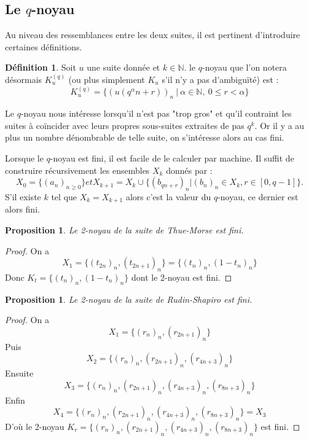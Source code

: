 \documentclass[12pt]{article}
\theoremstyle{plain}
\newtheorem{proposition}[theoreme]{Proposition}
\theoremstyle{definition}
\newtheorem{definition}[theoreme]{D\'efinition}
\theoremstyle{remark}
\begin{document}
\subsection{Le $q$-noyau}

Au niveau des ressemblances entre les deux suites, il est pertinent d'introduire certaines d\'efinitions.

\begin{definition}
  Soit $u$ une suite donn\'ee et $k\in\mathbb{N}$. le $q$-noyau que l'on notera d\'esormais 
  $K_{u}^{(q)}$ (ou plus simplement $K_{u}$ s'il n'y a pas d'ambigu\"it\'e) est :
  \begin{displaymath}
    K_{u}^{(q)}=\{(u(q^{\alpha}n+r))_{n}\ |\ \alpha\in\mathbb{N},\ 0\le{r}<\alpha\}
  \end{displaymath}
\end{definition}

Le $q$-noyau nous int\'eresse lorsqu'il n'est pas "trop gros" et qu'il contraint les suites \`a co\"incider avec leurs propres sous-suites extraites de pas $q^{k}$. Or il y a au plus un nombre d\'enombrable de telle suite, on s'int\'eresse alors au cas fini.

Lorsque le $q$-noyau est fini, il est facile de le calculer par machine. Il suffit de construire r\'ecursivement les ensembles $X_{k}$ donn\'es par : 
$$X_{0}=\{(a_{n})_{n\ge 0}\} et X_{k+1}=X_{k}\cup\{(b_{qn+r})_{n}|(b_{n})_{n}\in{X_{k}},r\in{[0,q-1]}\}.$$
S'il existe $k$ tel que $X_{k}=X_{k+1}$ alors c'est la valeur du $q$-noyau, ce dernier est alors fini.

\begin{proposition}
  Le 2-noyau de la suite de Thue-Morse est fini.
\end{proposition}

\begin{proof}
  On a $$X_{1}=\{(t_{2n})_{n},(t_{2n+1})_{n}\}=\{(t_{n})_{n},(1-t_{n})_{n}\}$$
  Donc $K_{t}=\{(t_{n})_{n},(1-t_{n})_{n}\}$ dont le 2-noyau est fini.
\end{proof}

\begin{proposition}
  Le 2-noyau de la suite de Rudin-Shapiro est fini.
\end{proposition}

\begin{proof}
  On a $$X_{1}=\{(r_{n})_{n},(r_{2n+1})_{n}\}$$
  Puis $$X_{2}=\{(r_{n})_{n},(r_{2n+1})_{n},(r_{4n+3})_{n}\}$$
  Ensuite $$X_{3}=\{(r_{n})_{n},(r_{2n+1})_{n},(r_{4n+3})_{n},(r_{8n+3})_{n}\}$$
  Enfin $$X_{4}=\{(r_{n})_{n},(r_{2n+1})_{n},(r_{4n+3})_{n},(r_{8n+3})_{n}\}=X_{3}$$
  D'o\`u le 2-noyau $K_{r}=\{(r_{n})_{n},(r_{2n+1})_{n},(r_{4n+3})_{n},(r_{8n+3})_{n}\}$ est fini.
\end{proof}
\end{document}
